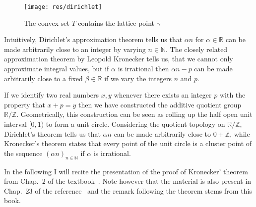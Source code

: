 \begin{figure}
  \begin{center}
    \texttt{[image: res/dirichlet]}
    \caption{The convex set \(T\) contains the lattice point \(γ\)}
    \label{fig:dirichlet}
  \end{center}
\end{figure}

Intuitively, Dirichlet's approximation theorem tells us that \(α n\) for \(α ∈
ℝ\) can be made arbitrarily close to an integer by varying \(n ∈ ℕ\). The
closely related approximation theorem by Leopold Kronecker tells us, that we
cannot only approximate integral values, but if \(α\) is irrational then \(α n -
p\) can be made arbitrarily close to a fixed \(β ∈ ℝ\) if we vary the integers
\(n\) and \(p\).

If we identify two real numbers \(x, y\) whenever there exists an integer \(p\)
with the property that \(x + p = y\) then we have constructed the additive
quotient group \(ℝ / ℤ\). Geometrically, this construction can be seen as
rolling up the half open unit interval \([0, 1)\) to form a unit circle.
Considering the quotient topology on \(ℝ / ℤ\), Dirichlet's theorem tells us
that \(α n\) can be made arbitrarily close to \(0 + ℤ\), while Kronecker's
theorem states that every point of the unit circle is a cluster point of the
sequence \((α n)_{n ∈ ℕ}\) if \(α\) is irrational.

In the following I will recite the presentation of the proof of Kronecker'
theorem from Chap.~2 of the textbook~\cite{Hlawka1991}. Note however that the
material is also present in Chap.~23 of the reference~\cite{Hardy1975} and the
remark following the theorem stems from this book.

